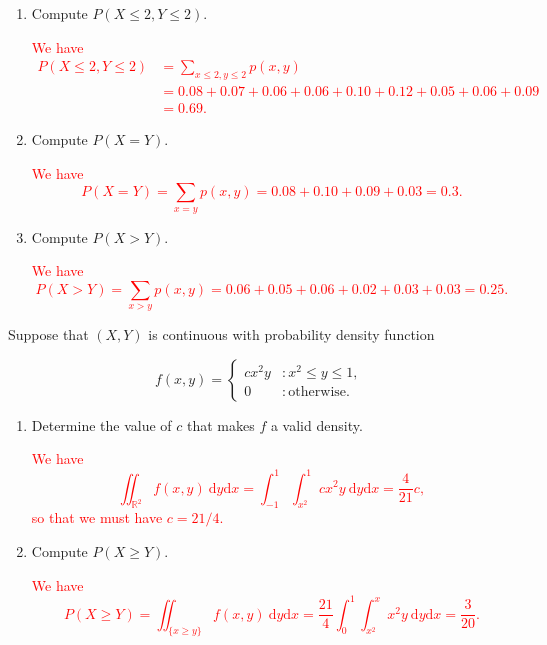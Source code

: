 \documentclass[12pt,reqno]{amsart}
\begin{document}
\medskip
\begin{enumerate}
    \item Compute $P(X\leq 2, Y\leq 2)$.
    
    \bigskip
    \textcolor{red}{We have
        \begin{align*}
            P(X\leq 2, Y\leq 2) &= \sum_{x\leq 2, y\leq 2}p(x,y) \\
            &= 0.08 + 0.07 + 0.06 + 0.06 + 0.10 + 0.12 + 0.05 + 0.06 + 0.09 \\
            &= 0.69.
        \end{align*}}
    \bigskip

    \item Compute $P(X=Y)$.
    
    \bigskip
    \textcolor{red}{We have
        \[P(X=Y) = \sum_{x=y} p(x,y) = 0.08 + 0.10 + 0.09 + 0.03 = 0.3.\]}
    \bigskip

    \item Compute $P(X>Y)$.
    
    \bigskip
    \textcolor{red}{We have
        \[P(X>Y) = \sum_{x>y} p(x,y) = 0.06 + 0.05 + 0.06 + 0.02 + 0.03 + 0.03 = 0.25.\]}
\end{enumerate}
















\bigskip
\prob Suppose that $(X,Y)$ is continuous with probability density function

    \[f(x,y) = \begin{cases}
        cx^2 y & : x^2 \leq y \leq 1, \\
        0 & : \text{otherwise}.
    \end{cases}\]

\medskip
\begin{enumerate}
    \item Determine the value of $c$ that makes $f$ a valid density.
    
    \bigskip
    \textcolor{red}{We have
        \[\iint_{\mathbb{R}^2} f(x,y) \ \text{d}y\text{d}x = \int_{-1}^1 \int_{x^2}^1 cx^2y \ \text{d}y\text{d}x = \frac{4}{21}c, \]
    so that we must have $c = 21/4$.}
    \bigskip

    \item Compute $P(X\geq Y)$.
    
    \bigskip
    \textcolor{red}{We have
        \[P(X\geq Y) = \iint_{\{x\geq y\}} f(x,y) \ \text{d}y\text{d}x = \frac{21}{4}\int_0^1 \int_{x^2}^x  x^2y \ \text{d}y \text{d}x = \frac{3}{20}.\]
        }
\end{enumerate}
\end{document}
